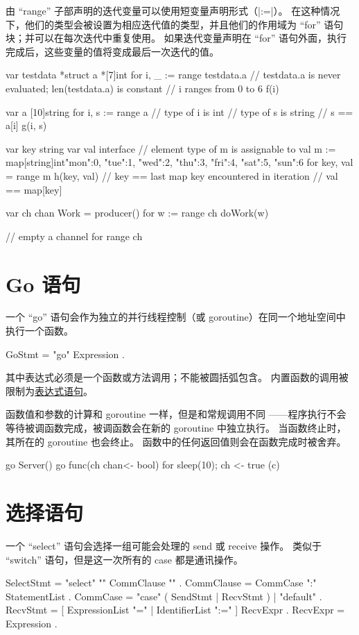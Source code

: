 由 ``range'' 子部声明的迭代变量可以使用短变量声明形式（\code|:=|）。
在这种情况下，他们的类型会被设置为相应迭代值的类型，并且他们的作用域为 ``for'' 语句块；并可以在每次迭代中重复使用。
如果迭代变量声明在 ``for'' 语句外面，执行完成后，这些变量的值将变成最后一次迭代的值。
\begin{golang}
var testdata *struct {
	a *[7]int
}
for i, _ := range testdata.a {
	// testdata.a is never evaluated; len(testdata.a) is constant
	// i ranges from 0 to 6
	f(i)
}

var a [10]string
for i, s := range a {
	// type of i is int
	// type of s is string
	// s == a[i]
	g(i, s)
}

var key string
var val interface {}  // element type of m is assignable to val
m := map[string]int{"mon":0, "tue":1, "wed":2, "thu":3, "fri":4, "sat":5, "sun":6}
for key, val = range m {
	h(key, val)
}
// key == last map key encountered in iteration
// val == map[key]

var ch chan Work = producer()
for w := range ch {
	doWork(w)
}

// empty a channel
for range ch {}
\end{golang}

\section{Go 语句} \label{sec:go statement}
一个 ``go'' 语句会作为独立的并行线程控制（或 goroutine）在同一个地址空间中执行一个函数。
\begin{EBNF}
GoStmt = "go" Expression .
\end{EBNF}

其中表达式必须是一个函数或方法调用；不能被圆括弧包含。
内置函数的调用被限制为\hyperref[sec:expression statements]{表达式语句}。

函数值和参数的计算和 goroutine 一样，但是和常规调用不同
——程序执行不会等待被调函数完成，被调函数会在新的 goroutine 中独立执行。
当函数终止时，其所在的 goroutine 也会终止。
函数中的任何返回值则会在函数完成时被舍弃。
\begin{golang}
go Server()
go func(ch chan<- bool) { for { sleep(10); ch <- true }} (c)
\end{golang}

\section{选择语句}
一个 ``select'' 语句会选择一组可能会处理的 send 或 receive 操作。
类似于 ``switch'' 语句，但是这一次所有的 case 都是通讯操作。
\begin{EBNF}
SelectStmt = "select" "{" { CommClause } "}" .
CommClause = CommCase ":" StatementList .
CommCase   = "case" ( SendStmt | RecvStmt ) | "default" .
RecvStmt   = [ ExpressionList "=" | IdentifierList ":=" ] RecvExpr .
RecvExpr   = Expression .
\end{EBNF}

